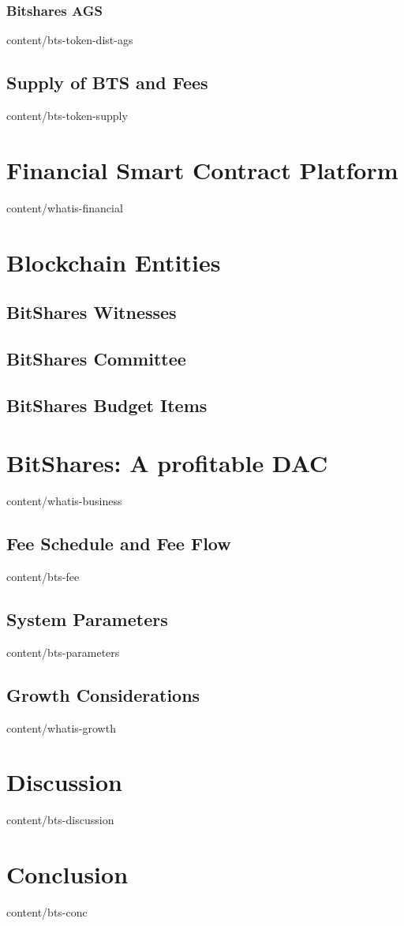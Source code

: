 \documentclass{btswhitepaper}
\begin{document}
\subsubsection { Bitshares AGS                     }  { content/bts-token-dist-ags  } 
\subsection    { Supply of BTS and Fees            }  { content/bts-token-supply    } 

\section       { Financial Smart Contract Platform }  { content/whatis-financial    } 

\section       { Blockchain Entities               }
\subsection    { BitShares Witnesses               } 
\subsection    { BitShares Committee               } 
\subsection    { BitShares Budget Items            } 

\section       { BitShares: A profitable DAC       }  { content/whatis-business     } 
\subsection    { Fee Schedule and Fee Flow         }  { content/bts-fee             }
\subsection    { System Parameters                 }  { content/bts-parameters      } 
\subsection    { Growth Considerations             }  { content/whatis-growth       } 

\section       { Discussion                        }  { content/bts-discussion      } 

\section       { Conclusion                        }  { content/bts-conc            } 



\end{document}
